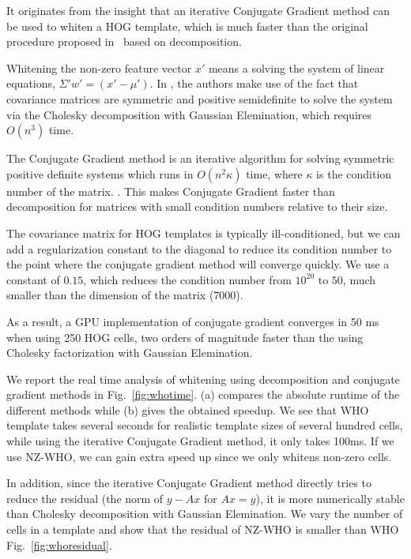 It originates from the insight that an iterative
Conjugate Gradient method can be used to whiten a HOG template, which
is much faster than the original procedure proposed
in~\cite{Hariharan12} based on decomposition.

Whitening the non-zero
feature vector $x'$ means a solving the system of linear equations, $\Sigma' w' = (x' -
\mu')$. In
\cite{Hariharan12}, the authors make use of the fact that covariance matrices
are symmetric and positive semidefinite to solve the system via the Cholesky
decomposition with Gaussian Elemination, which requires $O(n^3)$ time.

The Conjugate Gradient method is an iterative algorithm for solving symmetric
positive definite systems which runs in $O(n^2\kappa)$ time, where $\kappa$ is
the condition number of the matrix. \cite{Shewchuk94}.
%
This makes Conjugate Gradient faster than decomposition for matrices with small condition
numbers relative to their size.

The covariance matrix for HOG templates is typically ill-conditioned\cite{Hariharan12}, but we
can add a regularization constant to the diagonal to reduce its condition
number to the point where the conjugate gradient method will converge quickly.
We use a constant of $0.15$, which reduces the condition number from $10^{20}$
to $50$, much smaller than the dimension of the matrix (7000).

As a result, a GPU implementation of conjugate gradient converges in 50
ms when using 250 HOG cells, two orders of magnitude faster than the using
Cholesky factorization with Gaussian Elemination.


We report the real time analysis of whitening using decomposition and
conjugate gradient methods in Fig.~\ref{fig:whotime}. (a) compares the
absolute runtime of the different methods while (b) gives the obtained
speedup. We see that %
WHO template takes several seconds for realistic template sizes of
several hundred cells, while using the iterative Conjugate Gradient
method, it only takes 100ms. If we use NZ-WHO, we can gain extra speed
up since we only whitens non-zero cells.

In addition, since the iterative Conjugate Gradient method directly
tries to reduce the residual (the norm of $y-Ax$ for $Ax = y$), it is
more numerically stable than Cholesky decomposition with Gaussian
Elemination. We vary the number of cells in a template and show that
the residual of NZ-WHO is smaller than WHO Fig.~\ref{fig:whoresidual}.

